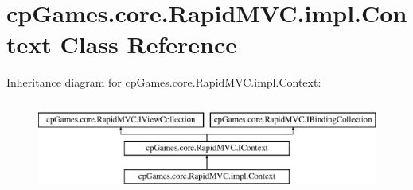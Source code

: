 \hypertarget{classcp_games_1_1core_1_1_rapid_m_v_c_1_1impl_1_1_context}{}\section{cp\+Games.\+core.\+Rapid\+M\+V\+C.\+impl.\+Context Class Reference}
\label{classcp_games_1_1core_1_1_rapid_m_v_c_1_1impl_1_1_context}
Inheritance diagram for cp\+Games.\+core.\+Rapid\+M\+V\+C.\+impl.\+Context\+:\begin{figure}[H]
\begin{center}
\leavevmode
\includegraphics[height=3.000000cm]{classcp_games_1_1core_1_1_rapid_m_v_c_1_1impl_1_1_context}
\end{center}
\end{figure}
